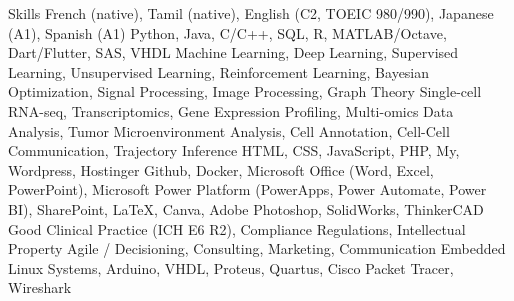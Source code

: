 
\begin{rubric}{Skills}
\entry*[Languages]
French (native), Tamil (native), English (C2, TOEIC 980/990), Japanese (A1), Spanish (A1)
Python, Java, C/C++, SQL, R, MATLAB/Octave, Dart/Flutter, SAS, VHDL
Machine Learning, Deep Learning, Supervised Learning, Unsupervised Learning, Reinforcement Learning, Bayesian Optimization, Signal Processing,  Image Processing, Graph Theory
\entry*[Bioinformatics]
Single-cell RNA-seq, Transcriptomics, Gene Expression Profiling, Multi-omics Data Analysis, Tumor Microenvironment Analysis, Cell Annotation, Cell-Cell Communication, Trajectory Inference
HTML, CSS, JavaScript, PHP, My, Wordpress, Hostinger
Github, Docker, Microsoft Office (Word, Excel, PowerPoint), Microsoft Power Platform (PowerApps, Power Automate, Power BI), SharePoint, \LaTeX, Canva, Adobe Photoshop, SolidWorks, ThinkerCAD
Good Clinical Practice (ICH E6 R2), Compliance Regulations, Intellectual Property
Agile / Decisioning, Consulting, Marketing, Communication
Embedded Linux Systems, Arduino, VHDL, Proteus, Quartus, Cisco Packet Tracer, Wireshark
\end{rubric}